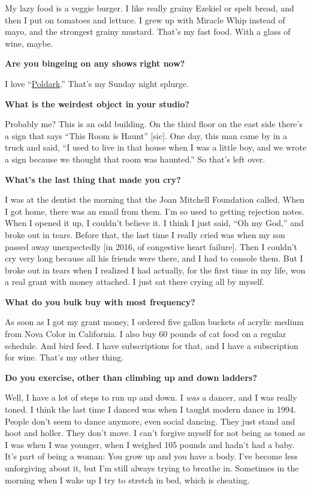 My lazy food is a veggie burger. I like really grainy Ezekiel or spelt
bread, and then I put on tomatoes and lettuce. I grew up with Miracle
Whip instead of mayo, and the strongest grainy mustard. That's my fast
food. With a glass of wine, maybe.

\textbf{Are you bingeing on any shows right now?}

I love
``\href{https://www.nytimes.com/watching/recommendations/poldark}{Poldark}.''
That's my Sunday night splurge.

\textbf{What is the weirdest object in your studio?}

Probably me? This is an odd building. On the third floor on the east
side there's a sign that says ``This Room is Haunt'' {[}sic{]}. One day,
this man came by in a truck and said, ``I used to live in that house
when I was a little boy, and we wrote a sign because we thought that
room was haunted.'' So that's left over.

\textbf{What's the last thing that made you cry?}

I was at the dentist the morning that the Joan Mitchell Foundation
called. When I got home, there was an email from them. I'm so used to
getting rejection notes. When I opened it up, I couldn't believe it. I
think I just said, ``Oh my God,'' and broke out in tears. Before that,
the last time I really cried was when my son passed away unexpectedly
{[}in 2016, of congestive heart failure{]}. Then I couldn't cry very
long because all his friends were there, and I had to console them. But
I broke out in tears when I realized I had actually, for the first time
in my life, won a real grant with money attached. I just sat there
crying all by myself.

\textbf{What do you bulk buy with most frequency?}

As soon as I got my grant money, I ordered five gallon buckets of
acrylic medium from Nova Color in California. I also buy 60 pounds of
cat food on a regular schedule. And bird feed. I have subscriptions for
that, and I have a subscription for wine. That's my other thing.

\textbf{Do you exercise, other than climbing up and down ladders?}

Well, I have a lot of steps to run up and down. I \emph{was} a dancer,
and I was really toned. I think the last time I danced was when I taught
modern dance in 1994. People don't seem to dance anymore, even social
dancing. They just stand and hoot and holler. They don't move. I can't
forgive myself for not being as toned as I was when I was younger, when
I weighed 105 pounds and hadn't had a baby. It's part of being a woman:
You grow up and you have a body. I've become less unforgiving about it,
but I'm still always trying to breathe in. Sometimes in the morning when
I wake up I try to stretch in bed, which is cheating.

